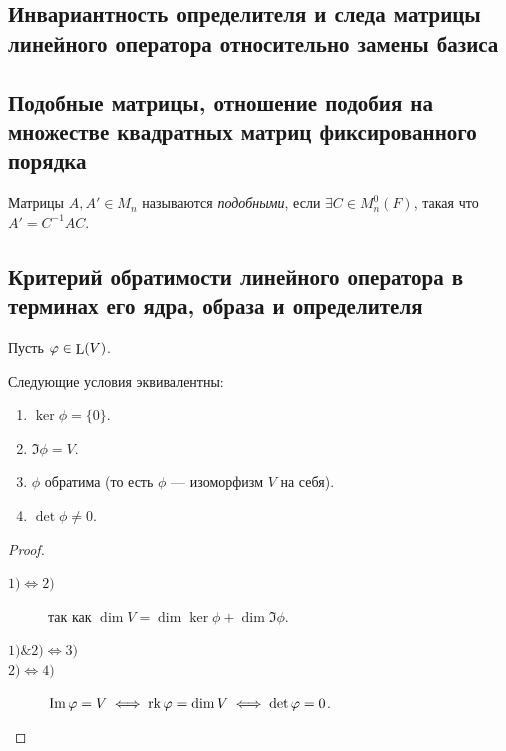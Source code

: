 \subsection{Инвариантность определителя и следа матрицы линейного оператора относительно замены базиса}

\subsection{Подобные матрицы, отношение подобия на множестве квадратных матриц фиксированного порядка}

\begin{definition}
    Матрицы $A, A' \in M_n$ называются \textit{подобными}, если $\exists C \in M_n^{0}(F)$, такая что $A' = C^{-1} A C$.
\end{definition}

\subsection{Критерий обратимости линейного оператора в терминах его ядра, образа и определителя}

Пусть $\varphi \in \operatorname{\mathop{\mathrm{L}}}(V)$.

\begin{proposal}
    Следующие условия эквивалентны:
    \begin{enumerate}[nosep]
    \item $\ker \phi = \{0\}$.
    \item $\Im \phi = V$.
    \item $\phi$ обратима (то есть $\phi$ --- изоморфизм $V$ на себя).
    \item $\det \phi \neq 0$.
    \end{enumerate}
\end{proposal}

\begin{proof}~
    \begin{description}
        \item[$1) \iff 2)$] так как $\dim V = \dim \ker \phi + \dim \Im \phi$. 
        \item[$1) \& 2) \iff 3)$]
        \item[$2) \iff 4)$] $\operatorname{\mathop{\mathrm{Im}}} \varphi = V \iff \operatorname{\mathop{\mathrm{rk}}} \varphi = \dim V \iff \det \varphi = 0$.
    \end{description}
\end{proof}

